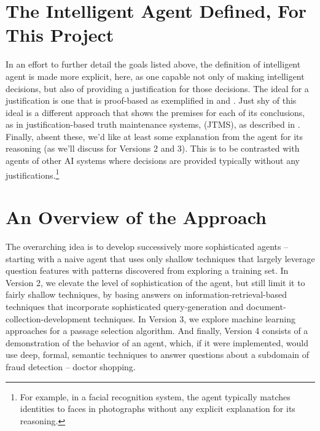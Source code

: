\section{The Intelligent Agent Defined, For This Project}
In an effort to further detail the goals listed above, the definition of intelligent agent is made more explicit, here, as one capable not only of making intelligent decisions, but also of providing a justification for those decisions.  The ideal for a justification is one that is proof-based as exemplified in \cite{bringsjord2015logicist} and \cite{johnson2014three}.  Just shy of this ideal is a different approach that shows the premises for each of its conclusions, as in justification-based truth maintenance systems, (JTMS), as described in \cite{russell_norvig_2010_sect12.6}. Finally, absent these, we'd like at least some explanation from the agent for its reasoning (as we'll discuss for Versions 2 and 3).  This is to be contrasted with agents of other AI systems where decisions are provided typically without any justifications.\footnote{For example, in a facial recognition system, the agent typically matches identities to faces in photographs without any explicit explanation for its reasoning.} 


%

\section{An Overview of the Approach}

The overarching idea is to develop successively more sophisticated agents -- starting with a naive agent that uses only shallow techniques that largely leverage question features with patterns discovered from exploring a training set.  In Version 2, we elevate the level of sophistication of the agent, but still limit it to fairly shallow techniques, by basing answers on information-retrieval-based techniques that incorporate sophisticated query-generation and document-collection-development techniques.  In Version 3, we explore machine learning approaches for a passage selection algorithm.  And finally, Version 4 consists of a  demonstration of the behavior of an agent, which, if it were implemented, would use deep, formal, semantic techniques to answer questions about a subdomain of fraud detection -- doctor shopping.

